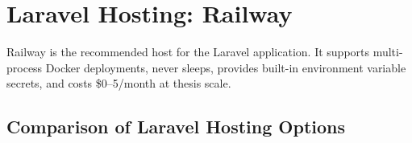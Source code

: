 \documentclass[12pt,a4paper]{report}
\begin{document}
\section{Laravel Hosting: Railway}

\begin{warningbox}
    Railway is the recommended host for the Laravel application.
    It supports multi-process Docker deployments, never sleeps, provides
    built-in environment variable secrets, and costs \$0--5/month at
    thesis scale.
\end{warningbox}

\subsection{Comparison of Laravel Hosting Options}
\end{document}
